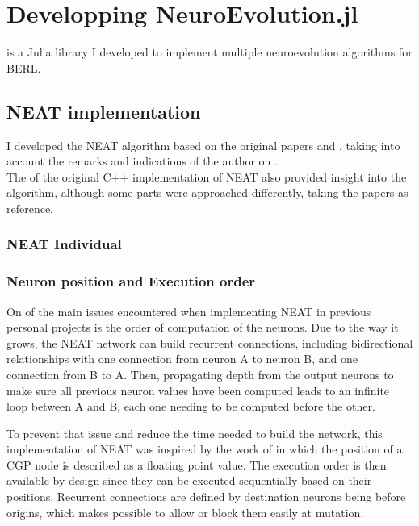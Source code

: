 \chapter{Developping NeuroEvolution.jl}
\label{sec:neuroevo}

\href{https://github.com/TemplierPaul/NeuroEvolution.jl}{\color{blue}{NeuroEvolution.jl}} is a Julia library I developed to implement multiple neuroevolution algorithms for BERL. 

\section{NEAT implementation}

I developed the NEAT algorithm based on the original papers \cite{NEAT_1} and \cite{NEAT_2}, taking into account the remarks and indications of the author on \href{https://www.cs.ucf.edu/~kstanley/neat.html#FAQ2}{
\color{blue}{his website}}. \\
The \href{https://github.com/FernandoTorres/NEAT}{\color{blue}{reorganized version}} of the original C++ implementation of NEAT also provided insight into the algorithm, although some parts were approached differently, taking the papers as reference.

\subsection{NEAT Individual}

\subsection{Neuron position and Execution order}

On of the main issues encountered when implementing NEAT in previous personal projects is the order of computation of the neurons. Due to the way it grows, the NEAT network can build recurrent connections, including bidirectional relationships with one connection from neuron A to neuron B, and one connection from B to A. Then, propagating depth from the output neurons to make sure all previous neuron values have been computed leads to an infinite loop between A and B, each one needing to be computed before the other. 

To prevent that issue and reduce the time needed to build the network, this implementation of NEAT was inspired by the work of \cite{wilson2018positionalcgp} in which the position of a CGP node is described as a floating point value. The execution order is then available by design since they can be executed sequentially based on their positions. Recurrent connections are defined by destination neurons being before origins, which makes possible to allow or block them easily at mutation. 

